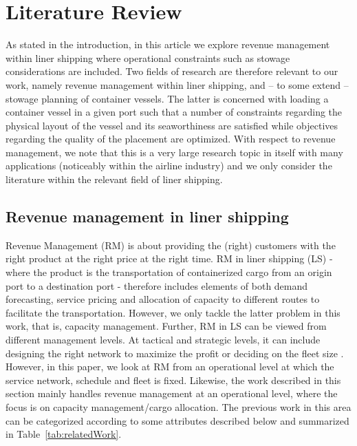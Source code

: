 \section{Literature Review}
\label{sec:relatedwork}
As stated in the introduction, in this article we explore revenue management within liner shipping where operational constraints such as stowage considerations are included. Two fields of research are therefore relevant to our work, namely revenue management within liner shipping, and -- to some extend --stowage planning of container vessels. The latter is concerned with loading a container vessel in a given port such that a number of constraints regarding the physical layout of the vessel and its seaworthiness are satisfied while objectives regarding the quality of the placement are optimized.
With respect to revenue management, we note that this is a very large research topic in itself with many applications (noticeably within the airline industry)  and we only consider the literature within the relevant field of liner shipping.   

\subsection{Revenue management in liner shipping}
Revenue Management (RM) is about providing the (right) customers with the right product at the right price at the right time. RM in liner shipping (LS) - where the product is the transportation of containerized cargo from an origin port to a destination port - therefore includes elements of both demand forecasting, service pricing and allocation of capacity to different routes to facilitate the transportation. However, we only tackle the latter problem in this work, that is, capacity management. Further, RM in LS can be viewed from different management levels. At tactical and strategic levels, it can include designing the right network to maximize the profit or deciding on the fleet size \citep[e.g.][]{Ting04,Song12}. However, in this paper, we look at RM from an operational level at which the service network, schedule and fleet is fixed. Likewise, the work described in this section mainly handles revenue management at an operational level, where the focus is on capacity management/cargo allocation. The previous work in this area can be categorized according to some attributes described below and summarized in Table~\ref{tab:relatedWork}.

